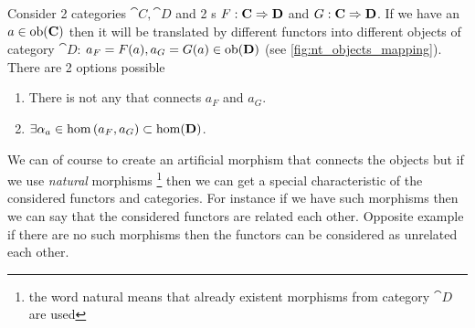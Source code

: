 Consider 2 categories $\cat{C}, \cat{D}$ and 2
s $F: \mathbf{C} \Rightarrow \mathbf{D}$ and $G:
\mathbf{C} \Rightarrow \mathbf{D}$. If we have an  $a \in \mathrm{ob}(\mathbf{C})$ then
it will be translated by different functors into different objects of
category $\cat{D}$: $a_F = F(a), a_G = G(a) \in \mathrm{ob}(\mathbf{D})$ (see
\cref{fig:nt_objects_mapping}). There are 2 options possible
\begin{enumerate}
\item There is not  any  that connects $a_F$
  and $a_G$.
\item $\exists \alpha_a \in \hom\left(a_F, a_G\right) \subset
  \mathrm{hom}(\mathbf{D})$. 
\end{enumerate}
We can of course to create an artificial morphism that connects the
objects but if we use \textit{natural} morphisms 
\footnote{the word natural means that already existent morphisms from
  category $\cat{D}$ are used}
then we can get a
special characteristic of the considered functors and categories. For
instance if we have such morphisms then we can say that the
considered functors are related each other. Opposite example if there
are no such morphisms then the functors can be considered as unrelated
each other. 

